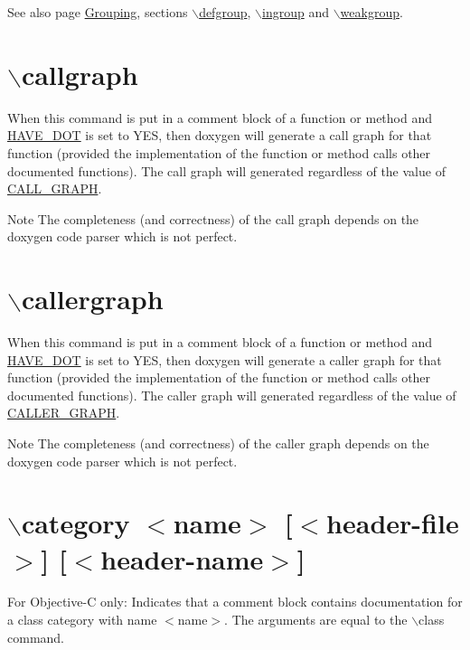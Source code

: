 \begin{DoxySeeAlso}{See also}
page \hyperlink{grouping}{Grouping}, sections \hyperlink{commands_cmddefgroup}{$\backslash$defgroup}, \hyperlink{commands_cmdingroup}{$\backslash$ingroup} and \hyperlink{commands_cmdweakgroup}{$\backslash$weakgroup}.
\end{DoxySeeAlso}
\hypertarget{commands_cmdcallgraph}{}\section{$\backslash$callgraph}\label{commands_cmdcallgraph}
 When this command is put in a comment block of a function or method and \hyperlink{config_cfg_have_dot}{HAVE\_\-DOT} is set to YES, then doxygen will generate a call graph for that function (provided the implementation of the function or method calls other documented functions). The call graph will generated regardless of the value of \hyperlink{config_cfg_call_graph}{CALL\_\-GRAPH}. \begin{DoxyNote}{Note}
The completeness (and correctness) of the call graph depends on the doxygen code parser which is not perfect.
\end{DoxyNote}


 \hypertarget{commands_cmdcallergraph}{}\section{$\backslash$callergraph}\label{commands_cmdcallergraph}
 When this command is put in a comment block of a function or method and \hyperlink{config_cfg_have_dot}{HAVE\_\-DOT} is set to YES, then doxygen will generate a caller graph for that function (provided the implementation of the function or method calls other documented functions). The caller graph will generated regardless of the value of \hyperlink{config_cfg_caller_graph}{CALLER\_\-GRAPH}. \begin{DoxyNote}{Note}
The completeness (and correctness) of the caller graph depends on the doxygen code parser which is not perfect.
\end{DoxyNote}


 \hypertarget{commands_cmdcategory}{}\section{$\backslash$category $<$name$>$ \mbox{[}$<$header-\/file$>$\mbox{]} \mbox{[}$<$header-\/name$>$\mbox{]}}\label{commands_cmdcategory}
 For Objective-\/C only: Indicates that a comment block contains documentation for a class category with name $<$name$>$. The arguments are equal to the $\backslash$class command.

